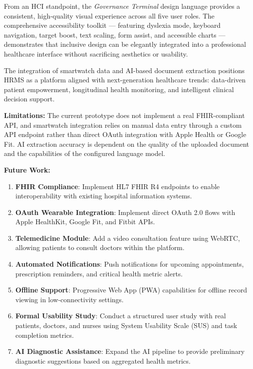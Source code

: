 \documentclass[12pt,a4paper]{report}
\begin{document}
From an HCI standpoint, the \textit{Governance Terminal} design language provides a consistent, high-quality visual experience across all five user roles. The comprehensive accessibility toolkit — featuring dyslexia mode, keyboard navigation, target boost, text scaling, form assist, and accessible charts — demonstrates that inclusive design can be elegantly integrated into a professional healthcare interface without sacrificing aesthetics or usability.

The integration of smartwatch data and AI-based document extraction positions HRMS as a platform aligned with next-generation healthcare trends: data-driven patient empowerment, longitudinal health monitoring, and intelligent clinical decision support.

\textbf{Limitations:} The current prototype does not implement a real FHIR-compliant API, and smartwatch integration relies on manual data entry through a custom API endpoint rather than direct OAuth integration with Apple Health or Google Fit. AI extraction accuracy is dependent on the quality of the uploaded document and the capabilities of the configured language model.

\textbf{Future Work:}
\begin{enumerate}
    \item \textbf{FHIR Compliance}: Implement HL7 FHIR R4 endpoints to enable interoperability with existing hospital information systems.
    \item \textbf{OAuth Wearable Integration}: Implement direct OAuth 2.0 flows with Apple HealthKit, Google Fit, and Fitbit APIs.
    \item \textbf{Telemedicine Module}: Add a video consultation feature using WebRTC, allowing patients to consult doctors within the platform.
    \item \textbf{Automated Notifications}: Push notifications for upcoming appointments, prescription reminders, and critical health metric alerts.
    \item \textbf{Offline Support}: Progressive Web App (PWA) capabilities for offline record viewing in low-connectivity settings.
    \item \textbf{Formal Usability Study}: Conduct a structured user study with real patients, doctors, and nurses using System Usability Scale (SUS) and task completion metrics.
    \item \textbf{AI Diagnostic Assistance}: Expand the AI pipeline to provide preliminary diagnostic suggestions based on aggregated health metrics.
\end{enumerate}
\end{document}
